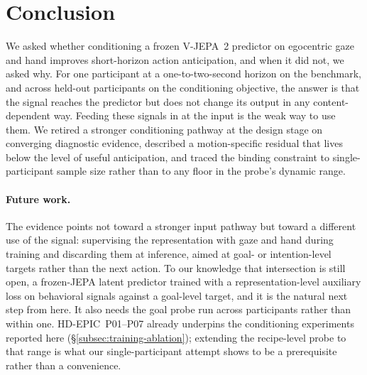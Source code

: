 \section{Conclusion}\label{sec:conclusion}

We asked whether conditioning a frozen V-JEPA~2 predictor on egocentric gaze and
hand improves short-horizon action anticipation, and when it did not, we asked
why. For one participant at a one-to-two-second horizon on the benchmark, and across
held-out participants on the conditioning objective, the answer is that the
signal reaches the predictor but does not change its output in any
content-dependent way. Feeding these signals in at the input is the weak way to
use them. We retired a stronger conditioning pathway at the design stage on
converging diagnostic evidence, described a motion-specific residual that lives
below the level of useful anticipation, and traced the binding constraint to
single-participant sample size rather than to any floor in the probe's dynamic
range.

\paragraph{Future work.}
The evidence points not toward a stronger input pathway but toward a different
use of the signal: supervising the representation with gaze and hand during
training and discarding them at inference, aimed at goal- or intention-level
targets rather than the next action. To our knowledge that intersection is still
open, a frozen-JEPA latent predictor trained with a representation-level
auxiliary loss on behavioral signals against a goal-level target, and it is the
natural next step from here. It also needs the goal probe run across participants rather than within one.
HD-EPIC~P01--P07 already underpins the conditioning experiments reported here
(\S\ref{subsec:training-ablation}); extending the recipe-level probe to that
range is what our single-participant attempt shows to be a prerequisite rather
than a convenience.